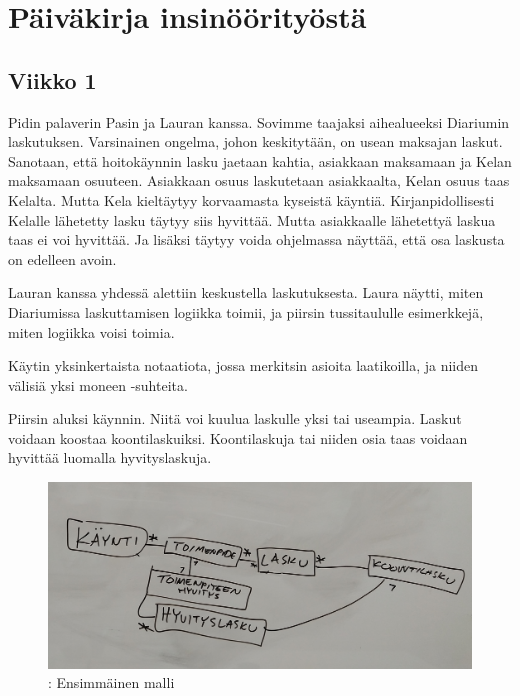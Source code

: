 \vspace{21.5pt}

\hypertarget{puxe4ivuxe4kirja-insinuxf6uxf6rityuxf6stuxe4}{%
\chapter{Päiväkirja
insinöörityöstä}\label{puxe4ivuxe4kirja-insinuxf6uxf6rityuxf6stuxe4}}

\hypertarget{viikko-1}{%
\section{Viikko 1}\label{viikko-1}}

Pidin palaverin Pasin ja Lauran kanssa. Sovimme taajaksi aihealueeksi
Diariumin laskutuksen. Varsinainen ongelma, johon keskitytään, on usean
maksajan laskut. Sanotaan, että hoitokäynnin lasku jaetaan kahtia,
asiakkaan maksamaan ja Kelan maksamaan osuuteen. Asiakkaan osuus
laskutetaan asiakkaalta, Kelan osuus taas Kelalta. Mutta Kela kieltäytyy
korvaamasta kyseistä käyntiä. Kirjanpidollisesti Kelalle lähetetty lasku
täytyy siis hyvittää. Mutta asiakkaalle lähetettyä laskua taas ei voi
hyvittää. Ja lisäksi täytyy voida ohjelmassa näyttää, että osa laskusta
on edelleen avoin.

Lauran kanssa yhdessä alettiin keskustella laskutuksesta. Laura näytti,
miten Diariumissa laskuttamisen logiikka toimii, ja piirsin
tussitaululle esimerkkejä, miten logiikka voisi toimia.

Käytin yksinkertaista notaatiota, jossa merkitsin asioita laatikoilla,
ja niiden välisiä yksi moneen -suhteita.

Piirsin aluksi käynnin. Niitä voi kuulua laskulle yksi tai useampia.
Laskut voidaan koostaa koontilaskuiksi. Koontilaskuja tai niiden osia
taas voidaan hyvittää luomalla hyvityslaskuja.

\begin{figure}
\centering
\includegraphics[width=\textwidth,height=0.3\textheight]{illustration/malli1.jpg}
\caption{\label{diarymalli1}: Ensimmäinen malli}
\end{figure}

